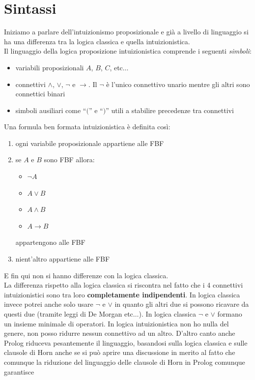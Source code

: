 \documentclass[a4paper,12pt, oneside]{book}
\begin{document}
\section{Sintassi}
Iniziamo a parlare dell'intuizionismo proposizionale e già a livello di
linguaggio si ha una differenza tra la logica classica e quella
intuizionistica.\\
Il linguaggio della logica proposizione intuizionistica comprende i seguenti
\textit{simboli}: 
\begin{itemize}
  \item variabili proposizionali $A$, $B$, $C$, etc$\ldots$
  \item connettivi $\land$, $\lor$, $\neg$ e $\to$. Il $\neg$ è l'unico
  connettivo unario mentre gli altri sono connettici binari
  \item simboli ausiliari come ``$($'' e ``$)$'' utili a stabilire precedenze
  tra connettivi 
\end{itemize}
Una formula ben formata intuizionistica è definita così:
\begin{enumerate}
  \item ogni variabile proposizionale appartiene alle FBF
  \item se $A$ e $B$ sono FBF allora:
  \begin{itemize}
    \item $\neg A$
    \item $A\lor B$
    \item $A\land B$
    \item $A\to B$
  \end{itemize}
  appartengono alle FBF
  \item nient'altro appartiene alle FBF
\end{enumerate}
E fin qui non si hanno differenze con la logica classica.\\
La differenza rispetto alla logica classica si riscontra nel fatto che i 4
connettivi intuizionistici sono tra loro \textbf{completamente indipendenti}. In
logica classica invece potrei anche solo usare $\neg$ e $\lor$ in quanto gli
altri due si possono ricavare da questi due (tramite leggi di De Morgan
etc$\ldots$). In logica classica $\neg$ e $\lor$ formano un insieme minimale di
operatori. In logica intuizionistica non ho nulla del genere, non posso ridurre
nessun connettivo ad un altro. D'altro canto anche Prolog riduceva pesantemente
il linguaggio, basandosi sulla logica classica e sulle clausole di Horn anche
se si può aprire una discussione in merito al fatto che comunque la riduzione
del linguaggio delle clausole di Horn in Prolog comunque garantisce
\end{document}
